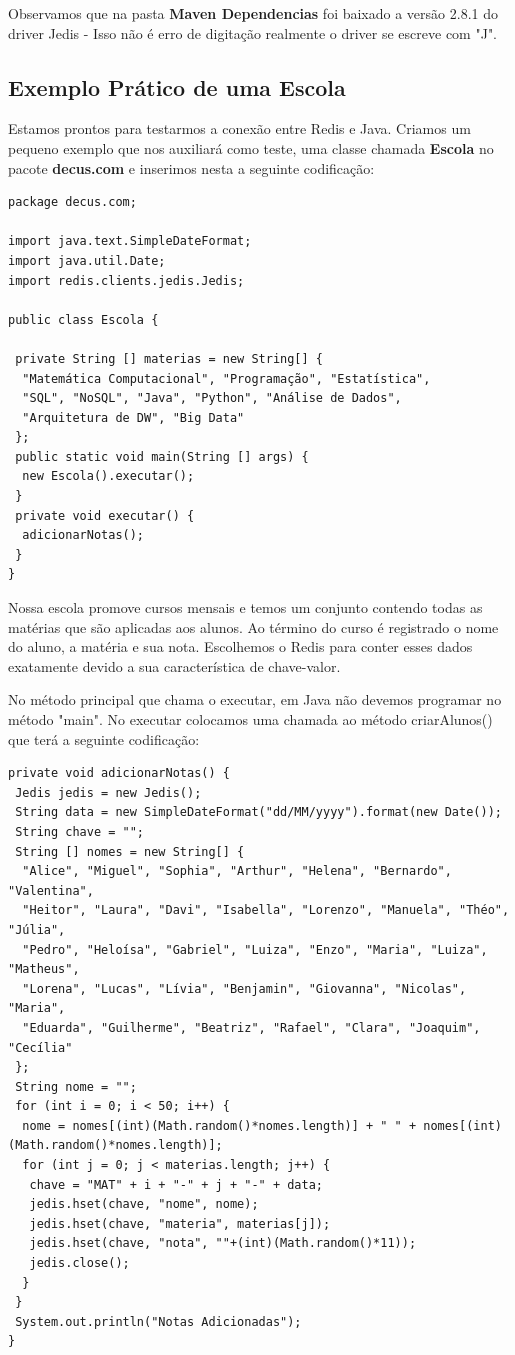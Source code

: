 Observamos que na pasta \textbf{Maven Dependencias} foi baixado a versão 2.8.1 do driver Jedis - Isso não é erro de digitação realmente o driver se escreve com "J".

\subsection{Exemplo Prático de uma Escola}
Estamos prontos para testarmos a conexão entre Redis e Java. Criamos um pequeno exemplo que nos auxiliará como teste, uma classe chamada \textbf{Escola} no pacote \textbf{decus.com} e inserimos nesta a seguinte codificação:
\begin{lstlisting}[]
package decus.com;

import java.text.SimpleDateFormat;
import java.util.Date;
import redis.clients.jedis.Jedis;

public class Escola {
	
 private String [] materias = new String[] {
  "Matemática Computacional", "Programação", "Estatística",
  "SQL", "NoSQL", "Java", "Python", "Análise de Dados",
  "Arquitetura de DW", "Big Data"
 };
 public static void main(String [] args) {
  new Escola().executar();
 }
 private void executar() {
  adicionarNotas();
 }
}
\end{lstlisting}

Nossa escola promove cursos mensais e temos um conjunto contendo todas as matérias que são aplicadas aos alunos. Ao término do curso é registrado o nome do aluno, a matéria e sua nota. Escolhemos o Redis para conter esses dados exatamente devido a sua característica de chave-valor.

No método principal que chama o executar, em Java não devemos programar no método "main". No executar colocamos uma chamada ao método criarAlunos() que terá a seguinte codificação:
\begin{lstlisting}[]
private void adicionarNotas() {
 Jedis jedis = new Jedis();
 String data = new SimpleDateFormat("dd/MM/yyyy").format(new Date());
 String chave = "";
 String [] nomes = new String[] {
  "Alice", "Miguel", "Sophia", "Arthur", "Helena", "Bernardo", "Valentina", 
  "Heitor", "Laura", "Davi", "Isabella", "Lorenzo", "Manuela", "Théo", "Júlia", 
  "Pedro", "Heloísa", "Gabriel", "Luiza", "Enzo", "Maria", "Luiza", "Matheus", 
  "Lorena", "Lucas", "Lívia", "Benjamin", "Giovanna", "Nicolas", "Maria", 
  "Eduarda", "Guilherme", "Beatriz", "Rafael", "Clara", "Joaquim", "Cecília"
 };
 String nome = "";
 for (int i = 0; i < 50; i++) {
  nome = nomes[(int)(Math.random()*nomes.length)] + " " + nomes[(int)(Math.random()*nomes.length)];
  for (int j = 0; j < materias.length; j++) {
   chave = "MAT" + i + "-" + j + "-" + data;
   jedis.hset(chave, "nome", nome);
   jedis.hset(chave, "materia", materias[j]);
   jedis.hset(chave, "nota", ""+(int)(Math.random()*11));
   jedis.close();
  }
 }
 System.out.println("Notas Adicionadas");
}
\end{lstlisting}

